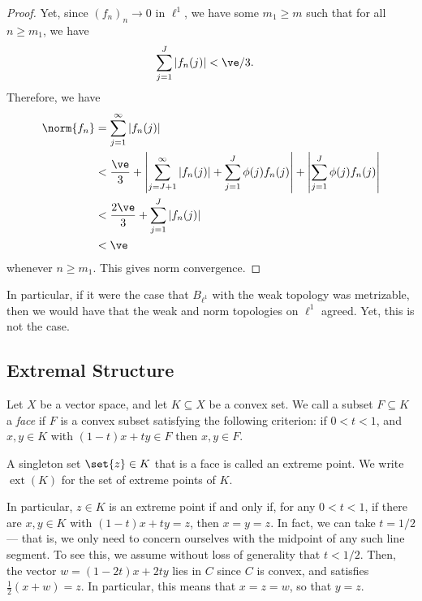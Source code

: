 \documentclass[10pt]{mypackage}
\begin{document}
\begin{proof}
  Yet, since $\left( f_n \right)_{n}\rightarrow 0$ in $\ell^1$, we have some $m_1\geq m$ such that for all $n\geq m_1$, we have
  \begin{align*}
    \sum_{j=1}^{J} \left\vert f_n(j) \right\vert &< \ve/3.
  \end{align*}
  Therefore, we have
  \begin{align*}
    \norm{f_n} &= \sum_{j=1}^{\infty} \left\vert f_n(j) \right\vert\\
               &< \frac{\ve}{3} + \left\vert \sum_{j=J+1}^{\infty}\left\vert f_n(j) \right\vert + \sum_{j=1}^{J}\phi(j)f_n(j) \right\vert + \left\vert \sum_{j=1}^{J}\phi(j)f_n(j) \right\vert\\
               &< \frac{2\ve}{3} + \sum_{j=1}^{J} \left\vert f_n(j) \right\vert\\
               &< \ve
  \end{align*}
  whenever $n\geq m_1$. This gives norm convergence.
\end{proof}
In particular, if it were the case that $B_{\ell^1}$ with the weak topology was metrizable, then we would have that the weak and norm topologies on $\ell^1$ agreed. Yet, this is not the case.
\subsection{Extremal Structure}%
\begin{definition}
  Let $X$ be a vector space, and let $K\subseteq X$ be a convex set. We call a subset $F\subseteq K$ a \textit{face} if $F$ is a convex subset satisfying the following criterion: if $0 < t < 1$, and $x,y\in K$ with $\left( 1-t \right)x + ty\in F$ then $x,y\in F$.

  A singleton set $\set{z}\in K$ that is a face is called an extreme point. We write $\operatorname{ext}\left( K \right)$ for the set of extreme points of $K$.
\end{definition}
In particular, $z\in K$ is an extreme point if and only if, for any $0 < t < 1$, if there are $x,y\in K$ with $\left( 1-t \right)x + ty = z$, then $x = y = z$. In fact, we can take $t = 1/2$ --- that is, we only need to concern ourselves with the midpoint of any such line segment. To see this, we assume without loss of generality that $t < 1/2$. Then, the vector $w = \left( 1-2t \right)x + 2ty$ lies in $C$ since $C$ is convex, and satisfies $\frac{1}{2}\left( x+w \right) = z$. In particular, this means that $x = z = w$, so that $y = z$.
\end{document}
